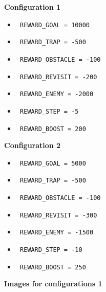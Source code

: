 \documentclass{article}
\begin{document}
\begin{itemize}
\noindent
    \begin{minipage}{0.6\textwidth}
            \hspace{35pt} \textbf{Configuration 1}
            \begin{itemize}
                \item \texttt{ REWARD\_GOAL = 10000}
                \item \texttt{ REWARD\_TRAP = -500}
                \item \texttt{ REWARD\_OBSTACLE = -100}
                \item \texttt{ REWARD\_REVISIT = -200}
                \item \texttt{ REWARD\_ENEMY = -2000}
                \item \texttt{ REWARD\_STEP = -5}
                \item \texttt{ REWARD\_BOOST = 200}
            \end{itemize}
    \end{minipage}
    \hspace{-20pt}
    \begin{minipage}{0.6\textwidth}
            \hspace{35pt} \textbf{Configuration 2}
            \begin{itemize}
                \item \texttt{ REWARD\_GOAL = 5000}
                \item \texttt{ REWARD\_TRAP = -500}
                \item \texttt{ REWARD\_OBSTACLE = -100   }
                \item \texttt{ REWARD\_REVISIT = -300}
                \item \texttt{ REWARD\_ENEMY = -1500}
                \item \texttt{ REWARD\_STEP = -10 }
                \item \texttt{ REWARD\_BOOST = 250}
            \end{itemize}
    \end{minipage}

\newpage

\hspace{4.5cm} \textbf{Images for configurations 1}


\end{itemize}
\end{document}
